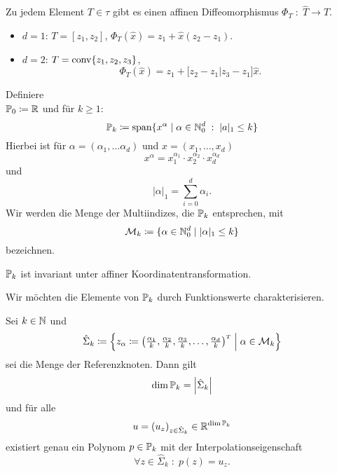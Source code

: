 \documentclass[../skript.tex]{subfiles}
\begin{document}
\begin{remark} %
\label{def:c2e3s3}
Zu jedem Element $T \in \tau$ gibt es einen affinen Diffeomorphismus $\Phi_T \; : \; \hat{T} \to T$.
\begin{itemize}
\item $d = 1$: $T = [z_1, z_2]$, $\Phi_T(\hat{x}) = z_1 + \hat{x} (z_2 - z_1)$.
\item $d = 2$: $T = \operatorname{conv} \{ z_1, z_2, z_3\}$, 
\[
	\Phi_T(\hat{x}) = z_1 + \Bigg[ z_2 - z_1 \Bigg| z_3 - z_1 \Bigg] \hat{x}.
\]
\end{itemize}
\end{remark}
\begin{definition} %
\label{def:c2e3s4}
Definiere \\ $\mathbb{P}_0 \coloneqq \mathbb{R}$ und für $k \geq 1$:
\[
	\mathbb{P}_k \coloneqq \operatorname*{span} \{ x^\alpha \mid \alpha \in \mathbb{N}_0^d \; : \; |a|_1 \leq k \}
\]
Hierbei ist für $\alpha = (\alpha_1, \ldots \alpha_d)$ und $x = (x_1, \ldots, x_d)$
\[
	x^\alpha = x_1^{\alpha_1} \cdot x_2^{\alpha_2} \cdot x_d^{\alpha_d}
\]
und
\[
	|\alpha|_1 = \sum_{i = 0}^d \alpha_i.
\]
Wir werden die Menge der Multiindizes, die $\mathbb{P}_k$ entsprechen, mit
\[
	\mathcal{M}_k \coloneqq \{ \alpha \in \mathbb{N}_0^d \mid |\alpha|_1 \leq k\}
\]
bezeichnen.
\end{definition}
\begin{remark} %
\label{bem:c2e3s5}
$\mathbb{P}_k$ ist invariant unter affiner Koordinatentransformation.
\end{remark}
Wir möchten die Elemente von $\mathbb{P}_k$ durch Funktionswerte charakterisieren.
\begin{theorem} %
\label{thm:c2e3s6}
Sei $k \in \mathbb{N}$ und
\[
\hat{\Sigma}_k \coloneqq \left\{ z_\alpha \coloneqq \begin{pmatrix}
\frac{\alpha_1}{k}, \frac{\alpha_2}{k}, \frac{\alpha_3}{k}, \ldots, \frac{\alpha_d}{k}
\end{pmatrix}^\tp \gmid \alpha \in \mathcal{M}_k \right\}
\]
sei die Menge der Referenzknoten.
Dann gilt
\[
\dim \mathbb{P}_k = \left|\hat{\Sigma}_k\right|
\]
und für alle
\[
	u = (u_z)_{z \in \hat{\Sigma}_k} \in \mathbb{R}^{\dim \mathbb{P}_k}
\]
existiert genau ein Polynom $p \in \mathbb{P}_k$ mit der Interpolationseigenschaft
\[
	\forall z \in \hat{\Sigma}_k \; : \; p(z) = u_z.
\]
\end{theorem}
\end{document}
